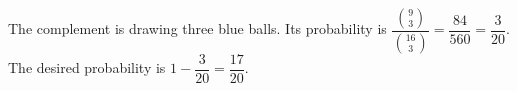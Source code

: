 The complement is drawing three blue balls. Its probability is $\dfrac{\binom93}{\binom{16}3}=\dfrac{84}{560}=\dfrac{3}{20}$. The desired probability is $1-\dfrac{3}{20}=\boxed{\dfrac{17}{20}}$.
